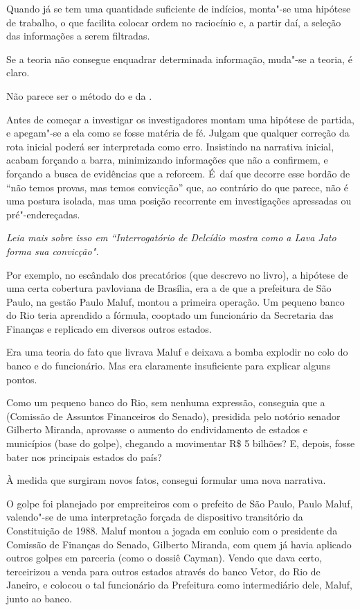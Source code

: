 Quando já se tem uma quantidade suficiente de indícios, monta"-se uma
hipótese de trabalho, o que facilita colocar ordem no raciocínio e, a
partir daí, a seleção das informações a serem filtradas.

Se a teoria não consegue enquadrar determinada informação, muda"-se a
teoria, é claro.

Não parece ser o método do  e da .

Antes de começar a investigar os investigadores montam uma hipótese de
partida, e apegam"-se a ela como se fosse matéria de fé. Julgam que
qualquer correção da rota inicial poderá ser interpretada como erro.
Insistindo na narrativa inicial, acabam forçando a barra, minimizando
informações que não a confirmem, e forçando a busca de evidências que a
reforcem. É~daí que decorre esse bordão de ``não temos provas, mas temos
convicção'' que, ao contrário do que parece, não é uma postura isolada,
mas uma posição recorrente em investigações apressadas ou
pré"-endereçadas.

\emph{Leia mais sobre isso em
``{Interrogatório
de Delcídio mostra como a Lava Jato forma sua convicção}".}

Por exemplo, no escândalo dos precatórios (que descrevo no livro), a
hipótese de uma certa cobertura pavloviana de Brasília, era a de que a
prefeitura de São Paulo, na gestão Paulo Maluf, montou a primeira
operação. Um pequeno banco do Rio teria aprendido a fórmula, cooptado um
funcionário da Secretaria das Finanças e replicado em diversos outros
estados.

Era uma teoria do fato que livrava Maluf e deixava a bomba explodir no
colo do banco e do funcionário. Mas era claramente insuficiente para
explicar alguns pontos.

Como um pequeno banco do Rio, sem nenhuma expressão, conseguia que a 
(Comissão de Assuntos Financeiros do Senado), presidida pelo notório
senador Gilberto Miranda, aprovasse o aumento do endividamento de
estados e municípios (base do golpe), chegando a movimentar R\$ 5
bilhões? E, depois, fosse bater nos principais estados do país?

À medida que surgiram novos fatos, consegui formular uma nova narrativa.

O golpe foi planejado por empreiteiros com o prefeito de São Paulo,
Paulo Maluf, valendo"-se de uma interpretação forçada de dispositivo
transitório da Constituição de 1988. Maluf montou a jogada em conluio
com o presidente da Comissão de Finanças do Senado, Gilberto Miranda,
com quem já havia aplicado outros golpes em parceria (como o dossiê
Cayman). Vendo que dava certo, terceirizou a venda para outros estados
através do banco Vetor, do Rio de Janeiro, e colocou o tal funcionário
da Prefeitura como intermediário dele, Maluf, junto ao banco.


